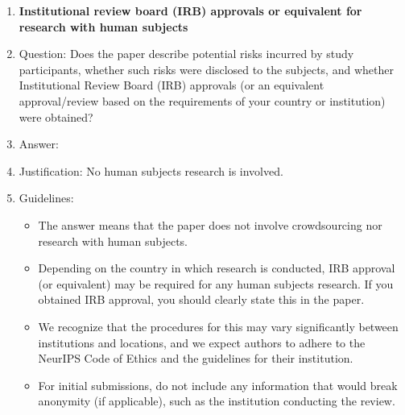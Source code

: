 \begin{enumerate}
\item {\bf Institutional review board (IRB) approvals or equivalent for research with human subjects}
    \item[] Question: Does the paper describe potential risks incurred by study participants, whether such risks were disclosed to the subjects, and whether Institutional Review Board (IRB) approvals (or an equivalent approval/review based on the requirements of your country or institution) were obtained?
    \item[] Answer: \answerNA{} %
    \item[] Justification: No human subjects research is involved.
    \item[] Guidelines:
    \begin{itemize}
        \item The answer \answerNA{} means that the paper does not involve crowdsourcing nor research with human subjects.
        \item Depending on the country in which research is conducted, IRB approval (or equivalent) may be required for any human subjects research. If you obtained IRB approval, you should clearly state this in the paper.
        \item We recognize that the procedures for this may vary significantly between institutions and locations, and we expect authors to adhere to the NeurIPS Code of Ethics and the guidelines for their institution.
        \item For initial submissions, do not include any information that would break anonymity (if applicable), such as the institution conducting the review.
    \end{itemize}


\end{enumerate}
